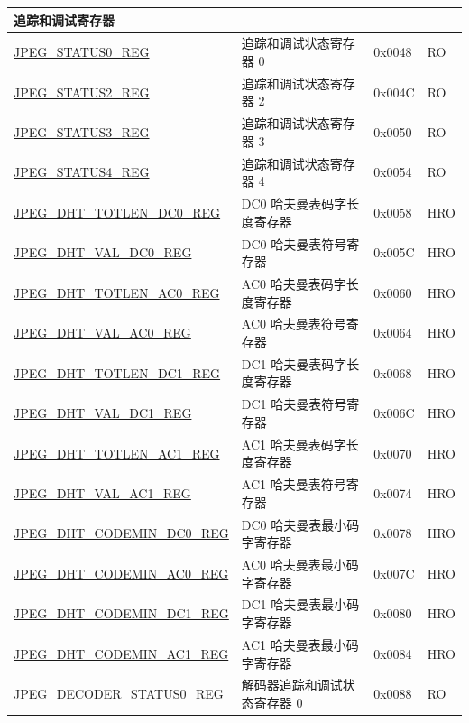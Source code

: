 \begin{longtable}{ | p{6cm} | p{7.2cm} | p{1.3cm} | p{1cm} | }
\multicolumn{4}{|l|}{\textbf{追踪和调试寄存器}} \\ \hline
\hyperref[regdesc:JPEGSTATUS0REG]{JPEG\_STATUS0\_REG} & 追踪和调试状态寄存器 0 & 0x0048 & RO \\ \hline
\hyperref[regdesc:JPEGSTATUS2REG]{JPEG\_STATUS2\_REG} & 追踪和调试状态寄存器 2 & 0x004C & RO \\ \hline
\hyperref[regdesc:JPEGSTATUS3REG]{JPEG\_STATUS3\_REG} & 追踪和调试状态寄存器 3 & 0x0050 & RO \\ \hline
\hyperref[regdesc:JPEGSTATUS4REG]{JPEG\_STATUS4\_REG} & 追踪和调试状态寄存器 4 & 0x0054 & RO \\ \hline
\hyperref[regdesc:JPEGDHTTOTLENDC0REG]{JPEG\_DHT\_TOTLEN\_DC0\_REG} & DC0 哈夫曼表码字长度寄存器 & 0x0058 & HRO \\ \hline
\hyperref[regdesc:JPEGDHTVALDC0REG]{JPEG\_DHT\_VAL\_DC0\_REG} & DC0 哈夫曼表符号寄存器 & 0x005C & HRO \\ \hline
\hyperref[regdesc:JPEGDHTTOTLENAC0REG]{JPEG\_DHT\_TOTLEN\_AC0\_REG} & AC0 哈夫曼表码字长度寄存器 & 0x0060 & HRO \\ \hline
\hyperref[regdesc:JPEGDHTVALAC0REG]{JPEG\_DHT\_VAL\_AC0\_REG} & AC0 哈夫曼表符号寄存器 & 0x0064 & HRO \\ \hline
\hyperref[regdesc:JPEGDHTTOTLENDC1REG]{JPEG\_DHT\_TOTLEN\_DC1\_REG} & DC1 哈夫曼表码字长度寄存器 & 0x0068 & HRO \\ \hline
\hyperref[regdesc:JPEGDHTVALDC1REG]{JPEG\_DHT\_VAL\_DC1\_REG} & DC1 哈夫曼表符号寄存器 & 0x006C & HRO \\ \hline
\hyperref[regdesc:JPEGDHTTOTLENAC1REG]{JPEG\_DHT\_TOTLEN\_AC1\_REG} & AC1 哈夫曼表码字长度寄存器 & 0x0070 & HRO \\ \hline
\hyperref[regdesc:JPEGDHTVALAC1REG]{JPEG\_DHT\_VAL\_AC1\_REG} & AC1 哈夫曼表符号寄存器 & 0x0074 & HRO \\ \hline
\hyperref[regdesc:JPEGDHTCODEMINDC0REG]{JPEG\_DHT\_CODEMIN\_DC0\_REG} & DC0 哈夫曼表最小码字寄存器 & 0x0078 & HRO \\ \hline
\hyperref[regdesc:JPEGDHTCODEMINAC0REG]{JPEG\_DHT\_CODEMIN\_AC0\_REG} & AC0 哈夫曼表最小码字寄存器 & 0x007C & HRO \\ \hline
\hyperref[regdesc:JPEGDHTCODEMINDC1REG]{JPEG\_DHT\_CODEMIN\_DC1\_REG} & DC1 哈夫曼表最小码字寄存器 & 0x0080 & HRO \\ \hline
\hyperref[regdesc:JPEGDHTCODEMINAC1REG]{JPEG\_DHT\_CODEMIN\_AC1\_REG} & AC1 哈夫曼表最小码字寄存器 & 0x0084 & HRO \\ \hline
\hyperref[regdesc:JPEGDECODERSTATUS0REG]{JPEG\_DECODER\_STATUS0\_REG} & 解码器追踪和调试状态寄存器 0 & 0x0088 & RO \\ \hline

\end{longtable}
